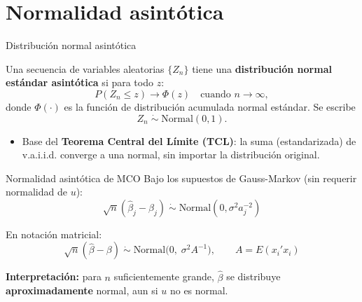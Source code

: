 \documentclass{beamer}
\begin{document}

    




\section{Normalidad asintótica}

\begin{frame}{Distribución normal asintótica}
\begin{definition}
Una secuencia de variables aleatorias $\{Z_n\}$ tiene una \textbf{distribución normal estándar asintótica} si para todo $z$:
$$P(Z_n \le z) \to \Phi(z) \quad \text{cuando } n \to \infty,$$
donde $\Phi(\cdot)$ es la función de distribución acumulada normal estándar. Se escribe
$$Z_n \; \dot\sim \; \text{Normal}(0,1).$$
\end{definition}
\begin{itemize}
\item Base del \textbf{Teorema Central del Límite (TCL)}: la suma (estandarizada) de v.a.i.i.d. converge a una normal, sin importar la distribución original.
\end{itemize}
\end{frame}

\begin{frame}{Normalidad asintótica de MCO }
Bajo los supuestos de Gauss-Markov (sin requerir normalidad de $u$):
$$\sqrt{n}(\hat\beta_j - \beta_j) \;\dot\sim\; \text{Normal}(0, \sigma^2 a_j^{-2})$$

En notación matricial:
$$\sqrt{n}(\hat\beta - \beta) \;\dot\sim\; \text{Normal}\big(0,\; \sigma^2 A^{-1}\big), \qquad A = E(x_i'x_i)$$

\textbf{Interpretación:} para $n$ suficientemente grande, $\hat\beta$ se distribuye \textbf{aproximadamente} normal, aun si $u$ no es normal.
\end{frame}
\end{document}
